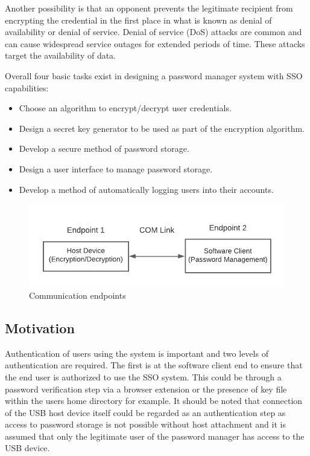 Another possibility is that an opponent prevents the legitimate recipient from encrypting the credential in the first place in what is known as denial of availability or denial of service. Denial of service (DoS) attacks are common and can cause widespread service outages for extended periods of time. These attacks target the availability of data.


Overall four basic tasks exist in designing a password manager system with SSO capabilities:

\begin{itemize}
  \item Choose an algorithm to encrypt/decrypt user credentials. 
  \item Design a secret key generator to be used as part of the encryption algorithm.
  \item Develop a secure method of password storage.
  \item Design a user interface to manage password storage.
  \item Develop a method of automatically logging users into their accounts.

  
\end{itemize}
\begin{figure}[H]
\centering
\includegraphics[width=0.65\columnwidth]{Figures/Fig_47.png}
\caption{Communication endpoints}
\label{fig:gantt}
\end{figure}



\subsection{Motivation}

Authentication of users using the system is important and two levels of authentication are required. The first is at the software client end to ensure that the end user is authorized to use the SSO system. This could be through a password verification step via a browser extension or the presence of key file within the users home directory for example. It should be noted that connection of the USB host device itself could be regarded as an authentication step as access to password storage is not possible without host attachment and it is assumed that only the legitimate user of the password manager has access to the USB device. 

